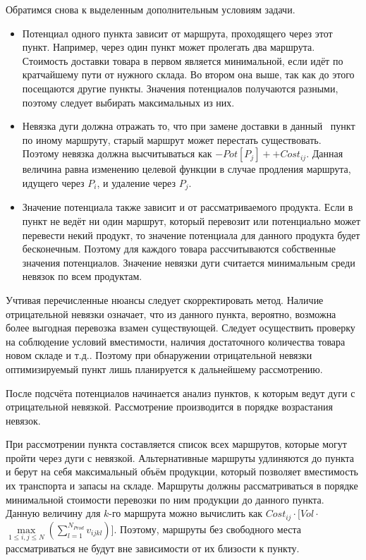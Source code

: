 	Обратимся снова к выделенным дополнительным условиям задачи.
	\begin{itemize}
		\item Потенциал одного пункта зависит от маршрута, проходящего через этот пункт. Например, через один пункт может пролегать два маршрута. Стоимость доставки товара в первом является минимальной, если идёт по кратчайшему пути от нужного склада. Во втором она выше, так как до этого посещаются другие пункты. Значения потенциалов получаются разными, поэтому следует выбирать максимальных из них.
		\item Невязка дуги должна отражать то, что при замене доставки в данный \, пункт по иному маршруту, старый маршрут может перестать существовать. Поэтому невязка должна высчитываться как $-Pot[P_j] + + Cost_{ij}$. Данная величина равна изменению целевой функции в случае продления маршрута, идущего через $P_i$, и удаление через $P_j$.
		\item Значение потенциала также зависит и от рассматриваемого продукта. Если в пункт не ведёт ни один маршрут, который перевозит или потенциально может перевести некий продукт, то значение потенциала для данного продукта будет бесконечным. Поэтому для каждого товара рассчитываются собственные значения потенциалов. Значение невязки дуги считается минимальным среди невязок по всем продуктам.
	\end{itemize}

	Учтивая перечисленные нюансы следует скорректировать метод. Наличие отрицательной невязки означает, что из данного пункта, вероятно, возможна более выгодная перевозка взамен существующей. Следует осуществить проверку на соблюдение условий вместимости, наличия достаточного количества товара новом складе и т.д.. Поэтому при обнаружении отрицательной невязки оптимизируемый пункт лишь планируется к дальнейшему рассмотрению.
	
	После подсчёта потенциалов начинается анализ пунктов, к которым ведут дуги с отрицательной невязкой. Рассмотрение производится в порядке возрастания невязок. 
	
	При рассмотрении пункта составляется список всех маршрутов, которые могут пройти через дуги с невязкой. Альтернативные маршруты удлиняются до пункта и берут на себя максимальный объём продукции, который позволяет вместимость их транспорта и запасы на складе. Маршруты должны рассматриваться в порядке минимальной стоимости перевозки по ним продукции до данного пункта. Данную величину для $k$-го маршрута можно вычислить как $Cost_{ij} \cdot [Vol \cdot $\(\max\limits_{1 \leq i, j \leq N}\)$ (\sum_{l=1}^{N_{Prod}} v_{ijkl})]$. Поэтому, маршруты без свободного места рассматриваться не будут вне зависимости от их близости к пункту. 
	
